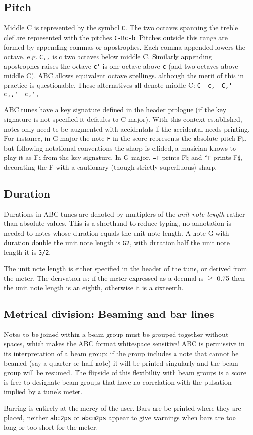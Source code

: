 \documentclass{article}
\begin{document}
\subsection{Pitch}
Middle C is represented by the symbol \verb+C+.
The two octaves spanning the treble clef are represented
with the pitches \verb+C-Bc-b+. Pitches outside this range are 
formed by appending commas or apostrophes. Each comma appended 
lowers the octave, e.g. \verb+C,,+ is c two octaves below middle 
C. Similarly appending apostrophes raises the octave \verb+c'+ 
is one octave above \verb+c+ (and two octaves above middle C). 
ABC allows equivalent octave spellings, although the merit of 
this in practice is questionable. These alternatives all denote 
middle C: \verb+C  c,  C,'  c,,'  c,',+

ABC tunes have a key signature defined in the header prologue 
(if the key signature is not specified it defaults to C major).
With this context established, notes only need to be augmented 
with accidentals if the accidental needs printing. For instance, 
in G major the note \verb+F+ in the score represents the 
absolute pitch F$\sharp$, but following notational conventions 
the sharp is ellided, a musician knows to play it as 
F$\sharp$ from the key signature. In G major, \verb+=F+ prints 
F$\natural$ and \verb+^F+ prints F$\sharp$, decorating the F 
with a cautionary (though strictly superfluous) sharp. 

\subsection{Duration}
Durations in ABC tunes are denoted by multiplers of the 
\emph{unit note length} rather than absolute values. This is a 
shorthand to reduce typing, no annotation is needed to notes 
whose duration equals the unit note length. A note G with 
duration double the unit note length is \verb+G2+, with duration 
half the unit note length it is \verb+G/2+.

The unit note length is either specified in the header of the 
tune, or derived from the meter. The derivation is: 
if the meter expressed as a decimal is $\geqq$ 0.75 then the 
unit note length is an eighth, otherwise it is a sixteenth.

\subsection{Metrical division: Beaming and bar lines}
Notes to be joined within a beam group must be grouped together
without spaces, which makes the ABC format whitespace sensitive!
ABC is permissive in its interpretation of a beam group: if the 
group includes a note that cannot be beamed (say a quarter or half
note) it will be printed singularly and the beam group will be 
resumed. The flipside of this flexibility with beam groups is a
score is free to designate beam groups that have no correlation  
with the pulsation implied by a tune's meter.

Barring is entirely at the mercy of the user. Bars are be printed 
where they are placed, neither \verb+abc2ps+ or \verb+abcm2ps+ 
appear to give warnings when bars are too long or too short for 
the meter.
\end{document}
